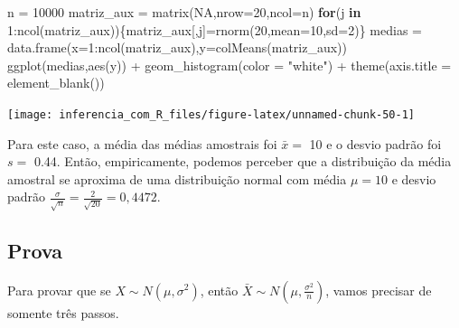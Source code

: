 \documentclass[
]{book}
\newenvironment{Shaded}{\begin{snugshade}}{\end{snugshade}}
\newcommand{\AttributeTok}[1]{\textcolor[rgb]{0.77,0.63,0.00}{#1}}
\newcommand{\ConstantTok}[1]{\textcolor[rgb]{0.00,0.00,0.00}{#1}}
\newcommand{\ControlFlowTok}[1]{\textcolor[rgb]{0.13,0.29,0.53}{\textbf{#1}}}
\newcommand{\DecValTok}[1]{\textcolor[rgb]{0.00,0.00,0.81}{#1}}
\newcommand{\FunctionTok}[1]{\textcolor[rgb]{0.00,0.00,0.00}{#1}}
\newcommand{\NormalTok}[1]{#1}
\newcommand{\OtherTok}[1]{\textcolor[rgb]{0.56,0.35,0.01}{#1}}
\newcommand{\SpecialCharTok}[1]{\textcolor[rgb]{0.00,0.00,0.00}{#1}}
\newcommand{\StringTok}[1]{\textcolor[rgb]{0.31,0.60,0.02}{#1}}
\begin{document}
\begin{Shaded}
\begin{Highlighting}[]
\NormalTok{n }\OtherTok{=} \DecValTok{10000}
\NormalTok{matriz\_aux }\OtherTok{=} \FunctionTok{matrix}\NormalTok{(}\ConstantTok{NA}\NormalTok{,}\AttributeTok{nrow=}\DecValTok{20}\NormalTok{,}\AttributeTok{ncol=}\NormalTok{n)}
\ControlFlowTok{for}\NormalTok{(j }\ControlFlowTok{in} \DecValTok{1}\SpecialCharTok{:}\FunctionTok{ncol}\NormalTok{(matriz\_aux))\{matriz\_aux[,j]}\OtherTok{=}\FunctionTok{rnorm}\NormalTok{(}\DecValTok{20}\NormalTok{,}\AttributeTok{mean=}\DecValTok{10}\NormalTok{,}\AttributeTok{sd=}\DecValTok{2}\NormalTok{)\}}
\NormalTok{medias }\OtherTok{=} \FunctionTok{data.frame}\NormalTok{(}\AttributeTok{x=}\DecValTok{1}\SpecialCharTok{:}\FunctionTok{ncol}\NormalTok{(matriz\_aux),}\AttributeTok{y=}\FunctionTok{colMeans}\NormalTok{(matriz\_aux))}
\FunctionTok{ggplot}\NormalTok{(medias,}\FunctionTok{aes}\NormalTok{(y)) }\SpecialCharTok{+}
  \FunctionTok{geom\_histogram}\NormalTok{(}\AttributeTok{color =} \StringTok{"white"}\NormalTok{) }\SpecialCharTok{+}
  \FunctionTok{theme}\NormalTok{(}\AttributeTok{axis.title =} \FunctionTok{element\_blank}\NormalTok{())}
\end{Highlighting}
\end{Shaded}

\begin{center}\texttt{[image: inferencia\_com\_R\_files/figure-latex/unnamed-chunk-50-1]} \end{center}

Para este caso, a média das médias amostrais foi \(\bar x=\) 10 e o desvio padrão foi \(s =\) 0.44. Então, empiricamente, podemos perceber que a distribuição da média amostral se aproxima de uma distribuição normal com média \(\mu=10\) e desvio padrão \(\frac{\sigma}{\sqrt{n}}=\frac{2}{\sqrt{20}}=0,4472\).

\hypertarget{prova}{%
\subsection{Prova}\label{prova}}

Para provar que se \(X\sim N(\mu,\sigma^2)\), então \(\bar X \sim N(\mu,\frac{\sigma^2}{n})\), vamos precisar de somente três passos.
\end{document}
